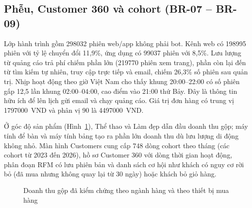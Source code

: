 \subsection{Phễu, Customer 360 và cohort (BR-07 -- BR-09)}
\label{sec:c4-br07-09}
Lớp hành trình gồm \num{298032} phiên web/app không phải bot. Kênh web có \num{198995} phiên với tỷ lệ chuyển đổi 11,9\%, ứng dụng có \num{99037} phiên với 8,5\%. Lưu lượng từ quảng cáo trả phí chiếm phần lớn (\num{219770} phiên xem trang), phần còn lại đến từ tìm kiếm tự nhiên, truy cập trực tiếp và email, chiếm 26,3\% số phiên sau quản trị. Nhịp hoạt động theo giờ Việt Nam cho thấy khung 20:00--22:00 có số phiên gấp 12,5 lần khung 02:00--04:00, cao điểm vào 21:00 thứ Bảy. Đây là thông tin hữu ích để lên lịch gửi email và chạy quảng cáo. Giá trị đơn hàng có trung vị \num{1797000}~VND và phân vị 90 là \num{4497000}~VND.

Ở góc độ sản phẩm (Hình~\ref{fig:products}), Thể thao và Làm đẹp dẫn đầu doanh thu gộp; máy tính để bàn và máy tính bảng tạo ra phần lớn doanh thu dù lưu lượng di động không nhỏ. Màn hình Customers cung cấp \num{748} dòng cohort theo tháng (các cohort từ 2023 đến 2026), hồ sơ Customer 360 với dòng thời gian hoạt động, phân đoạn RFM có lưu phiên bản và danh sách cơ hội như khách có nguy cơ rời bỏ (đã mua nhưng không quay lại từ 30 ngày) hoặc khách bỏ giỏ hàng.

\begin{figure}[H]
\centering
{}
\caption{Doanh thu gộp đã kiểm chứng theo ngành hàng và theo thiết bị mua hàng}
\label{fig:products}
\end{figure}

